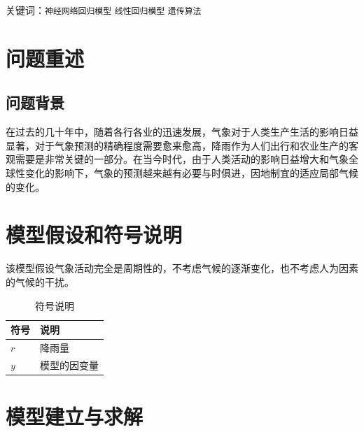 \documentclass[UTF8]{ctexart}
\begin{document}
关键词：\texttt{神经网络回归模型}  \texttt{线性回归模型}  \texttt{遗传算法}

  \newpage

  \section{问题重述}

\subsection{问题背景}

在过去的几十年中，随着各行各业的迅速发展，气象对于人类生产生活的影响日益显著，对于气象预测的精确程度需要愈来愈高，降雨作为人们出行和农业生产的客观需要是非常关键的一部分。在当今时代，由于人类活动的影响日益增大和气象全球性变化的影响下，气象的预测越来越有必要与时俱进，因地制宜的适应局部气候的变化。


  \section{模型假设和符号说明}
  
  该模型假设气象活动完全是周期性的，不考虑气候的逐渐变化，也不考虑人为因素的气候的干扰。

  \begin{table}[h]
    \centering
    \caption{符号说明}
    \begin{tabular}{p{6em}l}
      \hline 
      符号 & 说明 \\
      \hline 
      $r$ & 降雨量 \\
      $y$ & 模型的因变量 \\
      \hline
    \end{tabular}
  \end{table}

  \section{模型建立与求解}
  
\end{document}
